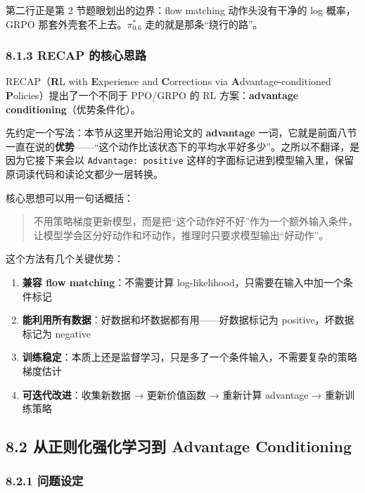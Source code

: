 \documentclass[
  chinese,
]{ctexart}
\providecommand{\tightlist}{%
  \setlength{\itemsep}{0pt}\setlength{\parskip}{0pt}}
\begin{document}
第二行正是第 2 节题眼划出的边界：flow matching 动作头没有干净的 log
概率，GRPO 那套外壳套不上去。\(\pi^{*}_{0.6}\)
走的就是那条``绕行的路''。

\subsubsection{8.1.3 RECAP
的核心思路}\label{recap-ux7684ux6838ux5fc3ux601dux8def}

RECAP（\textbf{R}L with \textbf{E}xperience and \textbf{C}orrections via
\textbf{A}dvantage-conditioned \textbf{P}olicies）提出了一个不同于
PPO/GRPO 的 RL 方案：\textbf{advantage conditioning}（优势条件化）。

先约定一个写法：本节从这里开始沿用论文的 \textbf{advantage}
一词，它就是前面八节一直在说的\textbf{优势}------``这个动作比该状态下的平均水平好多少''。之所以不翻译，是因为它接下来会以
\texttt{Advantage:\ positive}
这样的字面标记进到模型输入里，保留原词读代码和读论文都少一层转换。

核心思想可以用一句话概括：

\begin{quote}
不用策略梯度更新模型，而是把``这个动作好不好''作为一个额外输入条件，让模型学会区分好动作和坏动作，推理时只要求模型输出``好动作''。
\end{quote}

这个方法有几个关键优势：

\begin{enumerate}
\def\labelenumi{\arabic{enumi}.}
\tightlist
\item
  \textbf{兼容 flow matching}：不需要计算
  log-likelihood，只需要在输入中加一个条件标记
\item
  \textbf{能利用所有数据}：好数据和坏数据都有用------好数据标记为
  positive，坏数据标记为 negative
\item
  \textbf{训练稳定}：本质上还是监督学习，只是多了一个条件输入，不需要复杂的策略梯度估计
\item
  \textbf{可迭代改进}：收集新数据 → 更新价值函数 → 重新计算 advantage →
  重新训练策略
\end{enumerate}

\subsection{8.2 从正则化强化学习到 Advantage
Conditioning}\label{ux4eceux6b63ux5219ux5316ux5f3aux5316ux5b66ux4e60ux5230-advantage-conditioning}

\subsubsection{8.2.1 问题设定}\label{ux95eeux9898ux8bbeux5b9a}
\end{document}
